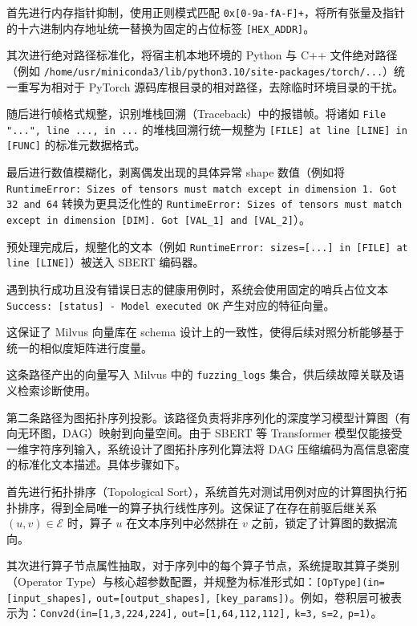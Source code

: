 首先进行内存指针抑制，使用正则模式匹配 \texttt{0x[0-9a-fA-F]+}，将所有张量及指针的十六进制内存地址统一替换为固定的占位标签 \texttt{[HEX\_ADDR]}。

其次进行绝对路径标准化，将宿主机本地环境的 Python 与 C++ 文件绝对路径（例如 \texttt{/home/usr/miniconda3/lib/python3.10/site-packages/}\allowbreak\texttt{torch/...}）统一重写为相对于 PyTorch 源码库根目录的相对路径，去除临时环境目录的干扰。

随后进行帧格式规整，识别堆栈回溯（Traceback）中的报错帧。将诸如 \texttt{File "...", line ..., in ...} 的堆栈回溯行统一规整为 \texttt{[FILE] at line [LINE] in [FUNC]} 的标准元数据格式。

最后进行数值模糊化，剥离偶发出现的具体异常 shape 数值（例如将 \texttt{RuntimeError: Sizes of tensors must match except in dimension 1. Got 32 and 64} 转换为更具泛化性的 \texttt{RuntimeError: Sizes of tensors must match except in dimension [DIM]. Got [VAL\_1] and [VAL\_2]}）。



预处理完成后，规整化的文本（例如 \texttt{RuntimeError: sizes=[...] in [FILE] at line [LINE]}）被送入 SBERT 编码器。

遇到执行成功且没有错误日志的健康用例时，系统会使用固定的哨兵占位文本 \texttt{Success: [status] - Model executed OK} 产生对应的特征向量。

这保证了 Milvus 向量库在 schema 设计上的一致性，使得后续对照分析能够基于统一的相似度矩阵进行度量。

这条路径产出的向量写入 Milvus 中的 \texttt{fuzzing\_logs} 集合，供后续故障关联及语义检索诊断使用。







第二条路径为图拓扑序列投影。该路径负责将非序列化的深度学习模型计算图（有向无环图，DAG）映射到向量空间。由于 SBERT 等 Transformer 模型仅能接受一维字符序列输入，系统设计了图拓扑序列化算法将 DAG 压缩编码为高信息密度的标准化文本描述。具体步骤如下。



首先进行拓扑排序（Topological Sort），系统首先对测试用例对应的计算图执行拓扑排序，得到全局唯一的算子执行线性序列。这保证了在存在前驱后继关系 $(u, v) \in \mathcal{E}$ 时，算子 $u$ 在文本序列中必然排在 $v$ 之前，锁定了计算图的数据流向。

其次进行算子节点属性抽取，对于序列中的每个算子节点，系统提取其算子类别（Operator Type）与核心超参数配置，并规整为标准形式如：\allowbreak\texttt{[OpType](in=[input\_}\allowbreak\texttt{shapes],} \texttt{out=[output\_}\allowbreak\texttt{shapes],} \texttt{[key\_}\allowbreak\texttt{params])}。例如，卷积层可被表示为：\allowbreak\texttt{Conv2d(in=[1,}\allowbreak\texttt{3,}\allowbreak\texttt{224,}\allowbreak\texttt{224],} \texttt{out=[1,}\allowbreak\texttt{64,}\allowbreak\texttt{112,}\allowbreak\texttt{112],} \texttt{k=3,} \texttt{s=2,} \texttt{p=1)}。

